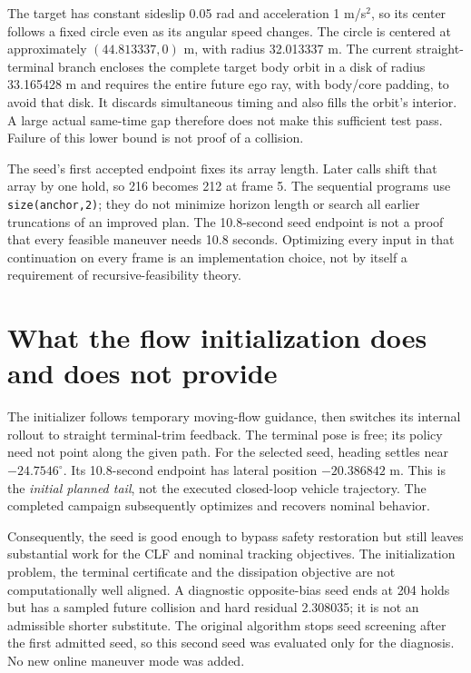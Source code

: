 \documentclass[11pt]{article}
\begin{document}
The target has constant sideslip 0.05 rad and acceleration 1 m/s$^2$, so its
center follows a fixed circle even as its angular speed changes. The circle is
centered at approximately $(44.813337,0)$ m, with radius 32.013337 m. The current
straight-terminal branch encloses the complete target body orbit in a disk of
radius 33.165428 m and requires the entire future ego ray, with body/core
padding, to avoid that disk. It discards simultaneous timing and also fills
the orbit's interior. A large actual same-time gap therefore does not make this
sufficient test pass. Failure of this lower bound is not proof of a collision.

The seed's first accepted endpoint fixes its array length. Later calls shift
that array by one hold, so 216 becomes 212 at frame 5. The sequential programs
use \texttt{size(anchor,2)}; they do not minimize horizon length or search all
earlier truncations of an improved plan. The 10.8-second seed endpoint is not
a proof that every feasible maneuver needs 10.8 seconds. Optimizing every
input in that continuation on every frame is an implementation choice, not
by itself a requirement of recursive-feasibility theory.

\section{What the flow initialization does and does not provide}
The initializer follows temporary moving-flow guidance, then switches its
internal rollout to straight terminal-trim feedback. The terminal pose is free;
its policy need not point along the given path. For the selected seed, heading
settles near $-24.7546^\circ$. Its 10.8-second endpoint has lateral position
$-20.386842$ m. This is the \emph{initial planned tail}, not the executed
closed-loop vehicle trajectory. The completed campaign subsequently optimizes
and recovers nominal behavior.

Consequently, the seed is good enough to bypass safety restoration but still
leaves substantial work for the CLF and nominal tracking objectives. The
initialization problem, the terminal certificate and the dissipation objective
are not computationally well aligned. A diagnostic opposite-bias seed ends at
204 holds but has a sampled future collision and hard residual 2.308035;
it is not an admissible shorter substitute. The original algorithm stops seed
screening after the first admitted seed, so this second seed was evaluated only
for the diagnosis. No new online maneuver mode was added.
\end{document}
